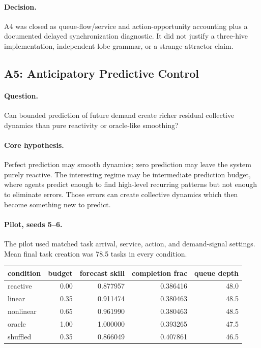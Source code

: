 \documentclass[11pt]{article}
\begin{document}
\paragraph{Decision.}
A4 was closed as queue-flow/service and action-opportunity accounting plus a
documented delayed synchronization diagnostic. It did not justify a three-hive
implementation, independent lobe grammar, or a strange-attractor claim.

\subsection{A5: Anticipatory Predictive Control}

\paragraph{Question.}
Can bounded prediction of future demand create richer residual collective
dynamics than pure reactivity or oracle-like smoothing?

\paragraph{Core hypothesis.}
Perfect prediction may smooth dynamics; zero prediction may leave the system
purely reactive. The interesting regime may be intermediate prediction budget,
where agents predict enough to find high-level recurring patterns but not
enough to eliminate errors. Those errors can create collective dynamics which
then become something new to predict.

\paragraph{Pilot, seeds 5--6.}
The pilot used matched task arrival, service, action, and demand-signal
settings. Mean final task creation was 78.5 tasks in every condition.

\begin{center}
\begin{tabular}{lrrrr}
condition & budget & forecast skill & completion frac & queue depth \\
\hline
reactive & 0.00 & 0.877957 & 0.386416 & 48.0 \\
linear & 0.35 & 0.911474 & 0.380463 & 48.5 \\
nonlinear & 0.65 & 0.961990 & 0.380463 & 48.5 \\
oracle & 1.00 & 1.000000 & 0.393265 & 47.5 \\
shuffled & 0.35 & 0.866049 & 0.407861 & 46.5
\end{tabular}
\end{center}
\end{document}
